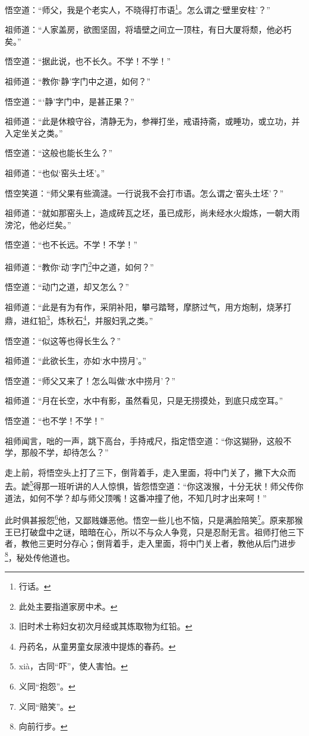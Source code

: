 \documentclass[12pt,UTF8]{ctexbook}
\begin{document}
悟空道：“师父，我是个老实人，不晓得打市语\footnote{行话。}。怎么谓之‘壁里安柱’？”

祖师道：“人家盖房，欲图坚固，将墙壁之间立一顶柱，有日大厦将颓，他必朽矣。”

悟空道：“据此说，也不长久。不学！不学！”

祖师道：“教你‘静’字门中之道，如何？”

悟空道：“‘静’字门中，是甚正果？”

祖师道：“此是休粮守谷，清静无为，参禅打坐，戒语持斋，或睡功，或立功，并入定坐关之类。”

悟空道：“这般也能长生么？”

祖师道：“也似‘窑头土坯’。”

悟空笑道：“师父果有些滴澾。一行说我不会打市语。怎么谓之‘窑头土坯’？”

祖师道：“就如那窑头上，造成砖瓦之坯，虽已成形，尚未经水火煅炼，一朝大雨滂沱，他必烂矣。”

悟空道：“也不长远。不学！不学！”

祖师道：“教你‘动’字门\footnote{此处主要指道家房中术。}中之道，如何？”

悟空道：“动门之道，却又怎么？”

祖师道：“此是有为有作，采阴补阳，攀弓踏弩，摩脐过气，用方炮制，烧茅打鼎，进红铅\footnote{旧时术士称妇女初次月经或其炼取物为红铅。}，炼秋石\footnote{丹药名，从童男童女尿液中提炼的春药。}，并服妇乳之类。”

悟空道：“似这等也得长生么？”

祖师道：“此欲长生，亦如‘水中捞月’。”

悟空道：“师父又来了！怎么叫做‘水中捞月’？”

祖师道：“月在长空，水中有影，虽然看见，只是无捞摸处，到底只成空耳。”

悟空道：“也不学！不学！”

祖师闻言，咄的一声，跳下高台，手持戒尺，指定悟空道：“你这猢狲，这般不学，那般不学，却待怎么？”

走上前，将悟空头上打了三下，倒背着手，走入里面，将中门关了，撇下大众而去。諕\footnote{xi\`a，古同“吓”，使人害怕。}得那一班听讲的人人惊惧，皆怨悟空道：“你这泼猴，十分无状！师父传你道法，如何不学？却与师父顶嘴！这番冲撞了他，不知几时才出来呵！”

此时俱甚报怨\footnote{义同“抱怨”。}他，又鄙贱嫌恶他。悟空一些儿也不恼，只是满脸陪笑\footnote{义同“赔笑”。}。原来那猴王已打破盘中之谜，暗暗在心，所以不与众人争竞，只是忍耐无言。祖师打他三下者，教他三更时分存心；倒背着手，走入里面，将中门关上者，教他从后门进步\footnote{向前行步。}，秘处传他道也。
\end{document}
